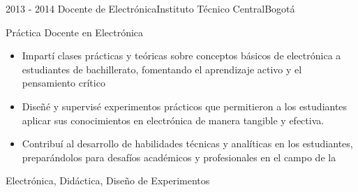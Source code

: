 \begin{experiences}
  \experience
  {2013 - 2014}  {Docente de Electrónica}{Instituto Técnico Central}{Bogotá}
  {}   {
          Práctica Docente en Electrónica  
          \begin{itemize}
            \item Impartí clases prácticas y teóricas sobre conceptos básicos de electrónica a estudiantes de bachillerato, fomentando el aprendizaje activo y el pensamiento crítico
            \item Diseñé y supervisé experimentos prácticos que permitieron a los estudiantes aplicar sus conocimientos en electrónica de manera tangible y efectiva.
            \item Contribuí al desarrollo de habilidades técnicas y analíticas en los estudiantes, preparándolos para desafíos académicos y profesionales en el campo de la 
          \end{itemize}
     }
     {Electrónica, Didáctica, Diseño de Experimentos}
\end{experiences}
